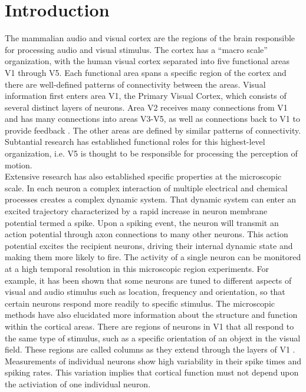 \documentclass[a4paper,11pt]{article}
\begin{document}
\section{Introduction} 
The mammalian audio and visual cortex are the regions of the brain responsible for processing audio and visual stimulus.
The cortex has a ``macro scale'' organization, with the human visual cortex separated into five functional areas V1 through V5.
Each functional area spans a specific region of the cortex and there are well-defined patterns of connectivity between the areas.
Visual information first enters area V1, the Primary Visual Cortex, which consists of several distinct layers of neurons.
Area V2 receives many connections from V1 and has many connections into areas V3-V5, as well as connections back to V1 to provide feedback \cite{cortex_wiki}.
The other areas are defined by similar patterns of connectivity. 
Subtantial research has established functional roles for this highest-level organization, i.e. V5 is thought to be responsible for processing the perception of motion\cite{born2005}.
\\
Extensive research has also established specific properties at the microscopic scale.
In each neuron a complex interaction of multiple electrical and chemical processes creates a complex dynamic system.
That dynamic system can enter an excited trajectory characterized by a rapid increase in neuron membrane potential termed a spike.
Upon a spiking event, the neuron will transmit an action potential through axon connections to many other neurons.
This action potential excites the recipient neurons, driving their internal dynamic state and making them more likely to fire.
The activity of a single neuron can be monitored at a high temporal resolution in this microscopic region experiments.
For example, it has been shown that some neurons are tuned to different aspects of visual and audio stimulus such as location, frequency and orientation, so that certain neurons respond more readily to specific stimulus.
The microscopic methods have also elucidated more information about the structure and function within the cortical areas.
There are regions of neurons in V1 that all respond to the same type of stimulus, such as a specific orientation of an objext in the visual field.
These regions are called columns as they extend through the layers of V1 \cite{horton2005}. 
Measurements of individual neurons show high variability in their spike times and spiking rates\cite{keane2015}.
This variation implies that cortical function must not depend upon the activiation of one individual neuron.
\end{document}
